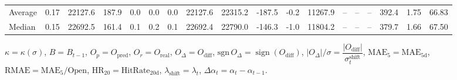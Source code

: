 \begin{threeparttable}
{\begin{tabular}{lrrrrrrrrrrrrrrrrr}
Average &     0.17 & 22127.6 &             187.9 &               0.0 &                0.0 &                0.0 & 22127.6 & 22315.2 &     -187.5 &                     -0.2 &             11267.9 &         -- &        -- &             -- &            392.4 &            1.75 &                  66.83 \\
 Median &     0.15 & 22692.5 &             161.4 &               0.1 &                0.2 &                0.1 & 22692.4 & 22790.0 &     -146.3 &                     -1.0 &             11804.2 &         -- &        -- &             -- &            379.7 &            1.66 &                  67.50 \\
\bottomrule
\end{tabular}
}
\begin{tablenotes}\footnotesize
\item $\kappa=\kappa(\sigma)$, $B=B_{t-1}$, $O_p=O_{\text{pred}}$, $O_r=O_{\text{real}}$, $O_\Delta=O_{\text{diff}}$, $\mathrm{sgn}\,O_\Delta=\operatorname{sign}(O_{\text{diff}})$, $|O_\Delta|/\sigma=\dfrac{|O_{\text{diff}}|}{\sigma_t^{\text{shift}}}$, $\mathrm{MAE}_5=\mathrm{MAE}_{5\text{d}}$, $\mathrm{RMAE}= \mathrm{MAE}_5 / \text{Open}$, $\mathrm{HR}_{20}=\mathrm{HitRate}_{20\text{d}}$, 
$\lambda_{\text{shift}}=\lambda_t$, 
$\Delta\alpha_t=\alpha_t-\alpha_{t-1}$.
\end{tablenotes}
\end{threeparttable}
\endgroup

